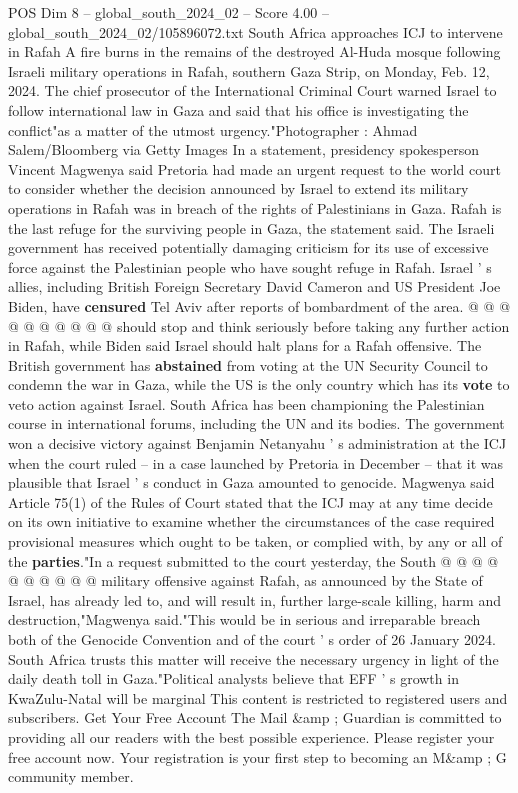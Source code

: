 \begin{textsample}{POS Dim 8 – global\_south\_2024\_02 – Score 4.00 – global\_south\_2024\_02/105896072.txt}  \label{ex:f8_pos_207}
South Africa approaches ICJ to intervene in Rafah A fire burns in the remains of the destroyed Al-Huda mosque following Israeli military operations in Rafah, southern Gaza Strip, on Monday, Feb. 12, 2024.
The chief prosecutor of the International Criminal Court warned Israel to follow international law in Gaza and said that his office is investigating the conflict"as a matter of the utmost urgency."Photographer : Ahmad Salem/Bloomberg via Getty Images In a statement, presidency spokesperson Vincent Magwenya said Pretoria had made an urgent request to the world court to consider whether the decision announced by Israel to extend its military operations in Rafah was in breach of the rights of Palestinians in Gaza.
Rafah is the last refuge for the surviving people in Gaza, the statement said.
The Israeli government has received potentially damaging criticism for its use of excessive force against the Palestinian people who have sought refuge in Rafah.
Israel ' s allies, including British Foreign Secretary David Cameron and US President Joe Biden, have \textbf{censured} Tel Aviv after reports of bombardment of the area. @ @ @ @ @ @ @ @ @ @ should stop and think seriously before taking any further action in Rafah, while Biden said Israel should halt plans for a Rafah offensive.
The British government has \textbf{abstained} from voting at the UN Security Council to condemn the war in Gaza, while the US is the only country which has its \textbf{vote} to veto action against Israel.
South Africa has been championing the Palestinian course in international forums, including the UN and its bodies.
The government won a decisive victory against Benjamin Netanyahu ' s administration at the ICJ when the court ruled -- in a case launched by Pretoria in December -- that it was plausible that Israel ' s conduct in Gaza amounted to genocide.
Magwenya said Article 75(1) of the Rules of Court stated that the ICJ may at any time decide on its own initiative to examine whether the circumstances of the case required provisional measures which ought to be taken, or complied with, by any or all of the \textbf{parties}."In a request submitted to the court yesterday, the South @ @ @ @ @ @ @ @ @ @ military offensive against Rafah, as announced by the State of Israel, has already led to, and will result in, further large-scale killing, harm and destruction,"Magwenya said."This would be in serious and irreparable breach both of the Genocide Convention and of the court ' s order of 26 January 2024.
South Africa trusts this matter will receive the necessary urgency in light of the daily death toll in Gaza."Political analysts believe that EFF ' s growth in KwaZulu-Natal will be marginal This content is restricted to registered users and subscribers.
Get Your Free Account The Mail \&amp ; Guardian is committed to providing all our readers with the best possible experience.
Please register your free account now.
Your registration is your first step to becoming an M\&amp ; G community member.

\end{textsample}

